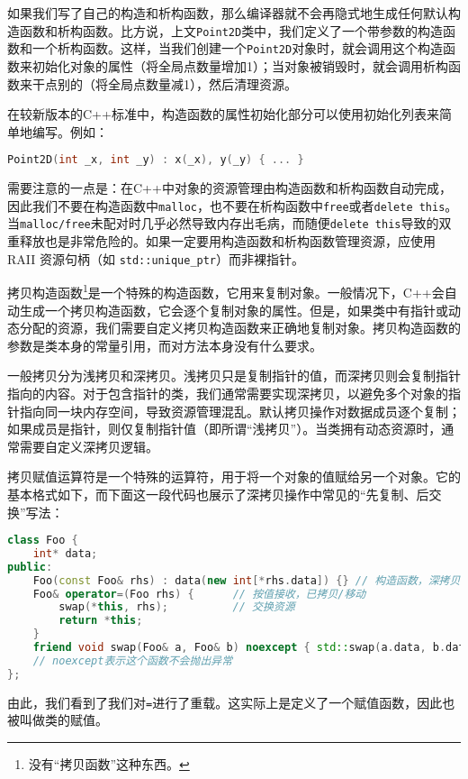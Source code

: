 \documentclass[../main.tex]{subfiles}
\begin{document}
如果我们写了自己的构造和析构函数，那么编译器就不会再隐式地生成任何默认构造函数和析构函数。比方说，上文\texttt{Point2D}类中，我们定义了一个带参数的构造函数和一个析构函数。这样，当我们创建一个\texttt{Point2D}对象时，就会调用这个构造函数来初始化对象的属性（将全局点数量增加1）；当对象被销毁时，就会调用析构函数来干点别的（将全局点数量减1），然后清理资源。

在较新版本的C++标准中，构造函数的属性初始化部分可以使用初始化列表来简单地编写。例如：
\begin{lstlisting}[language=C++]
Point2D(int _x, int _y) : x(_x), y(_y) { ... }
\end{lstlisting}

\begin{note}
  需要注意的一点是：在C++中对象的资源管理由构造函数和析构函数自动完成，因此我们不要在构造函数中\texttt{malloc}，也不要在析构函数中\texttt{free}或者\texttt{delete this}。当\texttt{malloc/free}未配对时几乎必然导致内存出毛病，而随便\texttt{delete this}导致的双重释放也是非常危险的。如果一定要用构造函数和析构函数管理资源，应使用 RAII 资源句柄（如 \texttt{std::unique\_ptr}）而非裸指针。
\end{note}

拷贝构造函数\footnote{没有“拷贝函数”这种东西。}是一个特殊的构造函数，它用来复制对象。一般情况下，C++会自动生成一个拷贝构造函数，它会逐个复制对象的属性。但是，如果类中有指针或动态分配的资源，我们需要自定义拷贝构造函数来正确地复制对象。拷贝构造函数的参数是类本身的常量引用，而对方法本身没有什么要求。

一般拷贝分为浅拷贝和深拷贝。浅拷贝只是复制指针的值，而深拷贝则会复制指针指向的内容。对于包含指针的类，我们通常需要实现深拷贝，以避免多个对象的指针指向同一块内存空间，导致资源管理混乱。默认拷贝操作对数据成员逐个复制；如果成员是指针，则仅复制指针值（即所谓“浅拷贝”）。当类拥有动态资源时，通常需要自定义深拷贝逻辑。

拷贝赋值运算符是一个特殊的运算符，用于将一个对象的值赋给另一个对象。它的基本格式如下，而下面这一段代码也展示了深拷贝操作中常见的“先复制、后交换”写法：
\begin{lstlisting}[language=C++]
class Foo {
    int* data;
public:
    Foo(const Foo& rhs) : data(new int[*rhs.data]) {} // 构造函数，深拷贝
    Foo& operator=(Foo rhs) {      // 按值接收，已拷贝/移动
        swap(*this, rhs);          // 交换资源
        return *this;
    }
    friend void swap(Foo& a, Foo& b) noexcept { std::swap(a.data, b.data); }
    // noexcept表示这个函数不会抛出异常
};
\end{lstlisting}
由此，我们看到了我们对\texttt{=}进行了重载。这实际上是定义了一个赋值函数，因此也被叫做类的赋值。
\end{document}
